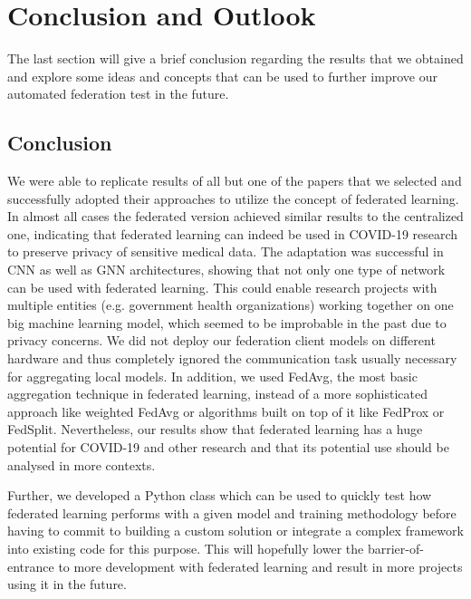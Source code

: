\section{Conclusion and Outlook}
The last section will give a brief conclusion regarding the results that we obtained and explore some ideas and concepts that can be used to further improve our automated federation test in the future.  

\subsection{Conclusion}
We were able to replicate results of all but one of the papers that we selected and successfully adopted their approaches to utilize the concept of federated learning. In almost all cases the federated version achieved similar results to the centralized one, indicating that federated learning can indeed be used in COVID-19 research to preserve privacy of sensitive medical data. The adaptation was successful in CNN as well as GNN architectures, showing that not only one type of network can be used with federated learning. This could enable research projects with multiple entities (e.g. government health organizations) working together on one big machine learning model, which seemed to be improbable in the past due to privacy concerns.
We did not deploy our federation client models on different hardware and thus completely ignored the communication task usually necessary for aggregating local models. In addition, we used FedAvg, the most basic aggregation technique in federated learning, instead of a more sophisticated approach like weighted FedAvg or algorithms built on top of it like FedProx\cite{fed_prox} or FedSplit\cite{fed_split}. Nevertheless, our results show that federated learning has a huge potential for COVID-19 and other research and that its potential use should be analysed in more contexts.

Further, we developed a Python class which can be used to quickly test how federated learning performs with a given model and training methodology before having to commit to building a custom solution or integrate a complex framework into existing code for this purpose. This will hopefully lower the barrier-of-entrance to more development with federated learning and result in more projects using it in the future.

